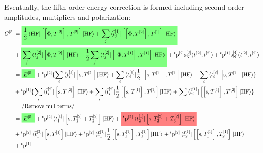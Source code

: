 Eventually, the fifth order energy correction is formed including second order
amplitudes, multipliers and polarization:
\begin{equation}\label{eq:fifth-order-G}
  \begin{aligned}
    G^{[5]} &=
    \highlight{green}
    {
    \frac{1}{2}\braket{\mathrm{HF} |
    \commutator{\commutator{\Phi}{T^{[2]}}}{T^{[2]}}
    | \mathrm{HF}}
    +
    \sum_j \braket{\tbar{j}^{[1]} |
    \commutator{\commutator{\Phi}{T^{[2]}}}{T^{[1]}}
    | \mathrm{HF}}
    }
    \\
    &+ \highlight{green}{\sum_j \braket{\tbar{j}^{[2]} |
      \commutator{\Phi}{T^{[2]}}
    | \mathrm{HF}}
    +
    \frac{1}{2}\sum_j\braket{\tbar{j}^{[2]} |
    \commutator{\commutator{\Phi}{T^{[1]}}}{T^{[1]}}
    | \mathrm{HF}}
    }
    + {}^t\p^{[2]}\s_{\mathrm{N}}^{[3]}(\tamp{}^{[2]}, \tbar{}^{[2]})
    + {}^t\p^{[1]}\s_{\mathrm{N}}^{[4]}(\tamp{}^{[2]}, \tbar{}^{[2]}) \\
    &= \highlight{green}{E^{[5]}}
    + {}^t\p^{[2]}
    \lbrace
    \sum_i\braket{\tbar{i}^{[1]} | \commutator{\s}{T^{[2]}} | \mathrm{HF}}
    +
    \sum_i\braket{\tbar{i}^{[1]} |
    \frac{1}{2}\commutator{\commutator{\s}{T^{[1]}}}{T^{[1]}}
    | \mathrm{HF}}
    +
    \sum_i\braket{\tbar{i}^{[2]} | \commutator{\s}{T^{[1]}} | \mathrm{HF}}
    \rbrace \\
    &+ {}^t\p^{[1]}
    \lbrace
    \sum_i\braket{\tbar{i}^{[2]} | \commutator{\s}{T^{[2]}} | \mathrm{HF}}
    +
    \sum_i\braket{\tbar{i}^{[2]} |
    \frac{1}{2}\commutator{\commutator{\s}{T^{[1]}}}{T^{[1]}}
    | \mathrm{HF}}
    +
    \sum_i\braket{\tbar{i}^{[1]} |
    \commutator{\commutator{\s}{T^{[1]}}}{T^{[2]}}
    | \mathrm{HF}}
    \rbrace \\
  &= \left/ \text{Remove null terms} \right/ \\
  &= \highlight{green}{E^{[5]}}
    + {}^t\p^{[2]}\braket{\tbar{1}^{[1]} | \commutator{\s}{T_1^{[2]} + T_2^{[2]}} | \mathrm{HF}}
    + \highlight{red}{
    {}^t\p^{[2]}\braket{\tbar{2}^{[1]} | \commutator{\s}{T_2^{[2]} + T_3^{[2]}} | \mathrm{HF}}
    } \\
    &+ {}^t\p^{[2]}\braket{\tbar{1}^{[2]} | \commutator{\s}{T^{[1]}} | \mathrm{HF}}
    + {}^t\p^{[2]}
    \braket{\tbar{1}^{[1]} |
    \frac{1}{2}\commutator{\commutator{\s}{T_1^{[1]}}}{T_1^{[1]}}
    | \mathrm{HF}}
    + {}^t\p^{[2]}
    \braket{\tbar{2}^{[1]} |
    \commutator{\commutator{\s}{T_1^{[1]}}}{T_2^{[1]}}
    | \mathrm{HF}}
    \\
    &+
    {}^t\p^{[1]}

\end{aligned}
\end{equation}
